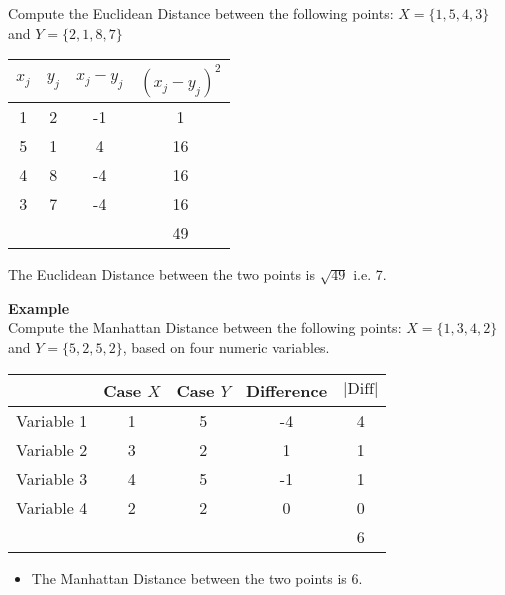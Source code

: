 \item 
Compute the Euclidean Distance between the following points:
$X = \{1,5,4,3\}$ and $Y = \{2,1,8,7\}$

\begin{center}
	\begin{tabular}{|c|c|c|c|}
		\hline
		$x_j$	&	$y_j$	&   $x_j - y_j$	&	$(x_j - y_j)^2$	\\ \hline
		1	&	2	&	-1	&	1	\\
		5	&	1	&	4	&	16	\\
		4	&	8	&	-4	&	16	\\
		3	&	7	&	-4	&	16	\\ \hline
		&		&		&	49	\\ \hline
	\end{tabular}
\end{center}
The Euclidean Distance between the two points is $\sqrt{49}$ i.e. 7.





\item  \textbf{Example}\\
Compute the Manhattan Distance between the following points: 
$X = \{1,3,4,2\}$ and $Y = \{5,2,5,2\}$, based on four numeric variables.


\begin{center}
	\begin{tabular}{|c|c|c|c|c|}
		\hline
	&	Case $X$	&	Case $Y$	&   Difference	&	$| \mbox{Diff} |$	\\ \hline
Variable 1	&	1	&	5	&	-4	&	4	\\
Variable 2	&	3	&	2	&	1	&	1	\\
Variable 3	&	4	&	5	&	-1	&	1	\\
Variable 4	&	2	&	2	&	0	&	0	\\ \hline
		& & && 6 \\
		\hline
	\end{tabular}
\end{center}
\begin{itemize}
\item The Manhattan Distance between the two points is 6.
\end{itemize}
